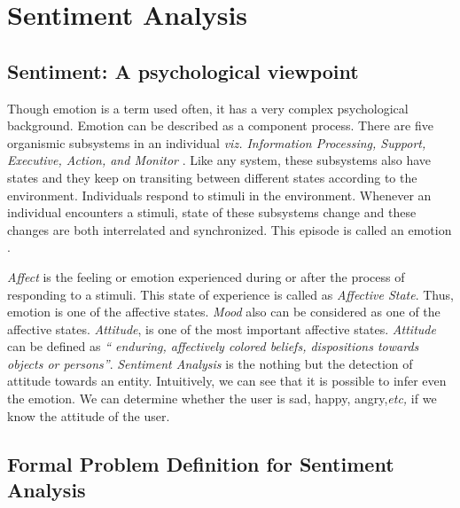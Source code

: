 
\chapter{Sentiment Analysis} %

\label{Chapter2} %


\section{Sentiment: A psychological viewpoint}

\par
Though emotion is a term used often, it has a very complex psychological background. Emotion can be described as a component process. 
There are five organismic subsystems in an individual \textit{viz. Information Processing, Support, Executive, Action, and Monitor} 
\citep*{scherer2010blueprint}. Like any system, these subsystems also have states and they keep on transiting between different states
according to the environment. Individuals respond to stimuli in the environment. Whenever an individual encounters a stimuli,
state of these subsystems change and these changes are both interrelated and synchronized. This episode is called an emotion \citep*{scherer2005emotions}.

\par
\textit{Affect} is the feeling or emotion experienced during or after the process of responding to a stimuli. This state of experience is 
called as \textit{Affective State}. Thus, emotion is one of the affective states. \textit{Mood} also can be considered as one of the affective states.
\textit{Attitude}, is one of the most important affective states. \textit{Attitude} can be defined as \textit{`` enduring, affectively colored beliefs, dispositions
towards objects or persons''}\citep*{scherer2005emotions}. \textit{Sentiment Analysis} is the nothing but the detection of attitude towards
an entity. Intuitively, we can see that it is possible to infer even the emotion. We can determine whether the user is sad, happy,
angry,\textit{etc,} if we know the attitude of the user.


\section{Formal Problem Definition for Sentiment Analysis}

